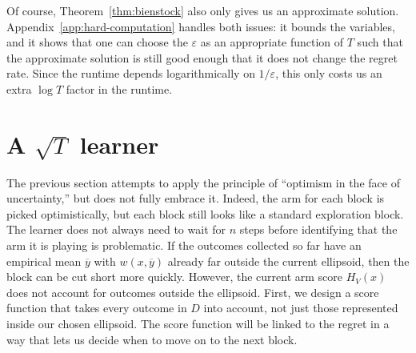 {Of course, Theorem~\ref{thm:bienstock} also only gives us an approximate
solution. Appendix~\ref{app:hard-computation} handles both issues: it
bounds the variables, and it shows that one can choose the $\varepsilon$
as an appropriate function of $T$ such that the approximate solution is
still good enough that it does not change the regret rate. Since the
runtime depends logarithmically on $1/\varepsilon$, this only costs us
an extra $\log T$ factor in the runtime.
}

\section{A $\sqrt{T}$ learner}\label{sec:soft-square-root}

{
The previous section attempts to apply the principle of ``optimism in the
face of uncertainty,'' but does not fully embrace it. Indeed, the arm for
each block is picked optimistically, but each block still looks like a
standard exploration block. The learner does not always need to wait for
$n$ steps before identifying that the arm it is playing is problematic.
If the outcomes collected so far have an empirical mean $\overline{y}$
with $w(x,\overline{y})$ already far outside the current ellipsoid, then
the block can be cut short more quickly. However, the current arm score $H_V(x)$ 
does not account for outcomes outside the ellipsoid. First, we design a
score function that takes every outcome in $D$ into account, not just
those represented inside our chosen ellipsoid. The score function will
be linked to the regret in a way that lets us decide when to move on to
the next block.
}

